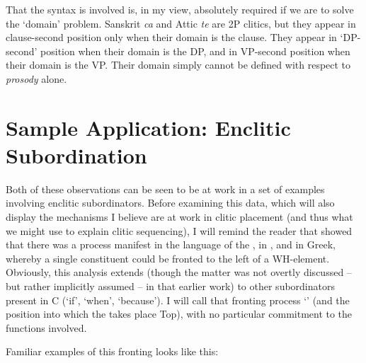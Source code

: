 \documentclass[output=paper,
modfonts
]{LSP/langsci}
\begin{document}
That the syntax is involved is, in my view, absolutely required if we are to solve
the `domain' problem. Sanskrit \textit{ca} and Attic \textit{te} are 2P clitics, but they appear
in clause-second position only when their domain is the clause. They appear in `DP-second' position
when their domain is the DP, and in VP-second position when their domain is the VP. Their domain
simply cannot be defined with respect to \textit{prosody} alone.

\section{Sample Application: Enclitic Subordination}
Both of these observations can be seen to be at work in a set of examples involving
enclitic subordinators. Before examining this data, which will also display the mechanisms I believe
are at work in clitic placement (and thus what we might use to explain clitic sequencing), I will
remind the reader that \citet{hale1987} showed that there was a process manifest in the language of
the , in , and in Greek, whereby a single constituent could be fronted to the left
of a WH-element. Obviously, this analysis extends (though the matter was not overtly discussed -- but rather
implicitly assumed -- in
that earlier work) to other subordinators present in C (`if', `when', `because'). I will call that fronting
process `' (and the position into which the  takes place Top), with no
particular commitment to the  functions involved.

Familiar examples of this fronting looks like this:

\end{document}
